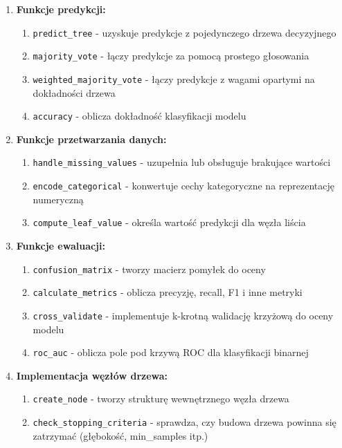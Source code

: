 \documentclass[11pt,a4paper]{article}
\begin{document}
\begin{enumerate}
    \item \textbf{Funkcje predykcji:}
    \begin{enumerate}
        \item \texttt{predict\_tree} - uzyskuje predykcje z pojedynczego drzewa decyzyjnego
        \item \texttt{majority\_vote} - łączy predykcje za pomocą prostego głosowania
        \item \texttt{weighted\_majority\_vote} - łączy predykcje z wagami opartymi na dokładności drzewa
        \item \texttt{accuracy} - oblicza dokładność klasyfikacji modelu
    \end{enumerate}

    \item \textbf{Funkcje przetwarzania danych:}
    \begin{enumerate}
        \item \texttt{handle\_missing\_values} - uzupełnia lub obsługuje brakujące wartości
        \item \texttt{encode\_categorical} - konwertuje cechy kategoryczne na reprezentację numeryczną
        \item \texttt{compute\_leaf\_value} - określa wartość predykcji dla węzła liścia
    \end{enumerate}

    \item \textbf{Funkcje ewaluacji:}
    \begin{enumerate}
        \item \texttt{confusion\_matrix} - tworzy macierz pomyłek do oceny
        \item \texttt{calculate\_metrics} - oblicza precyzję, recall, F1 i inne metryki
        \item \texttt{cross\_validate} - implementuje k-krotną walidację krzyżową do oceny modelu
        \item \texttt{roc\_auc} - oblicza pole pod krzywą ROC dla klasyfikacji binarnej
    \end{enumerate}

    \item \textbf{Implementacja węzłów drzewa:}
    \begin{enumerate}
        \item \texttt{create\_node} - tworzy strukturę wewnętrznego węzła drzewa
        \item \texttt{check\_stopping\_criteria} - sprawdza, czy budowa drzewa powinna się zatrzymać (głębokość, min\_samples itp.)
    \end{enumerate}
\end{enumerate}
\end{document}
